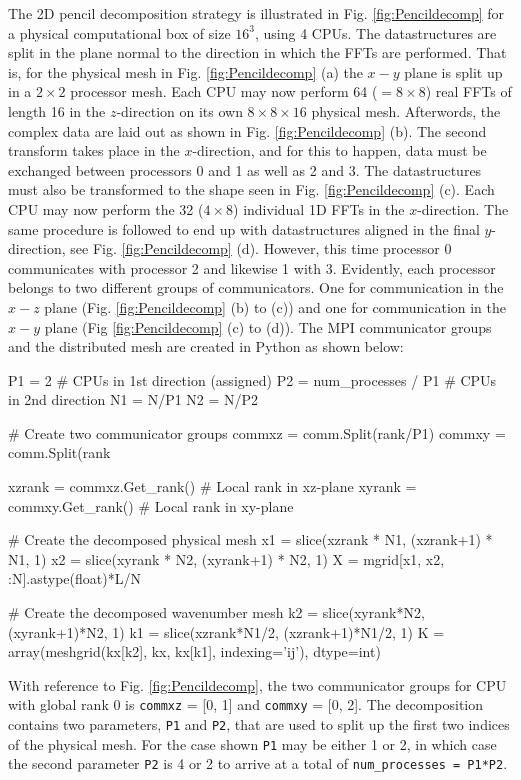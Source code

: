 \documentclass[11pt, oneside]{article}
\newcommand{\inpyth}{\lstinline[style=pythonstyle, basicstyle=\ttfamily]} %[]%
\begin{document}
The 2D pencil decomposition strategy is illustrated in Fig. \ref{fig:Pencildecomp} for a physical computational box of size $16^3$, using 4 CPUs. The datastructures are split in the plane normal to the direction in which the FFTs are performed. That is, for the physical mesh in Fig. \ref{fig:Pencildecomp} (a) the $x-y$ plane is split up in a $2\times2$ processor mesh. Each CPU may now perform 64 ($= 8 \times 8$) real FFTs of length 16 in the $z$-direction on its own $8 \times 8 \times 16$ physical mesh. Afterwords, the complex data are laid out as shown in Fig. \ref{fig:Pencildecomp} (b). The second transform takes place in the $x$-direction, and for this to happen, data must be exchanged between processors 0 and 1 as well as 2 and 3. The datastructures must also be transformed to the shape seen in Fig. \ref{fig:Pencildecomp} (c). Each CPU may now perform the 32 ($4 \times 8$) individual 1D FFTs in the $x$-direction. The same procedure is followed to end up with datastructures aligned in the final $y$-direction, see Fig. \ref{fig:Pencildecomp} (d). However, this time processor 0 communicates with processor 2 and likewise 1 with 3. Evidently, each processor belongs to two different groups of communicators. One for communication in the $x-z$ plane (Fig. \ref{fig:Pencildecomp} (b) to (c)) and one for communication in the $x-y$ plane (Fig \ref{fig:Pencildecomp} (c) to (d)). The MPI communicator groups and the distributed mesh are created in Python as shown below:

\begin{minipage}{\linewidth}
\begin{python}
P1 = 2                     # CPUs in 1st direction (assigned)
P2 = num_processes / P1    # CPUs in 2nd direction
N1 = N/P1
N2 = N/P2

# Create two communicator groups
commxz = comm.Split(rank/P1)
commxy = comm.Split(rank%
    
xzrank = commxz.Get_rank() # Local rank in xz-plane
xyrank = commxy.Get_rank() # Local rank in xy-plane
    
# Create the decomposed physical mesh
x1 = slice(xzrank * N1, (xzrank+1) * N1, 1)
x2 = slice(xyrank * N2, (xyrank+1) * N2, 1)
X = mgrid[x1, x2, :N].astype(float)*L/N

# Create the decomposed wavenumber mesh
k2 = slice(xyrank*N2, (xyrank+1)*N2, 1)
k1 = slice(xzrank*N1/2, (xzrank+1)*N1/2, 1)
K = array(meshgrid(kx[k2], kx, kx[k1], indexing='ij'), dtype=int)
\end{python}
\end{minipage}
With reference to Fig. \ref{fig:Pencildecomp}, the two communicator groups for CPU with global rank 0 is 
\inpyth{commxz} = [0, 1] and \inpyth{commxy} = [0, 2]. The decomposition contains two parameters, \inpyth{P1} and \inpyth{P2}, that are used to split up the first two indices of the physical mesh. 
For the case shown \inpyth{P1} may be either 1 or 2, in which case the second parameter \inpyth{P2} 
is 4 or 2 to arrive at a total of \inpyth{num_processes = P1*P2}.
\end{document}
